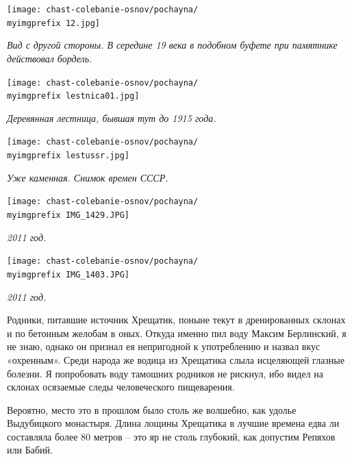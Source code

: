 \begin{center}
\texttt{[image: chast-colebanie-osnov/pochayna/\\myimgprefix 12.jpg]}

\textit{Вид с другой стороны. В середине 19 века в подобном буфете при памятнике действовал бордель.}
\end{center}

\newpage


\begin{center}
\texttt{[image: chast-colebanie-osnov/pochayna/\\myimgprefix lestnica01.jpg]}

\textit{Деревянная лестница, бывшая тут до 1915 года.}
\end{center}


\begin{center}
\texttt{[image: chast-colebanie-osnov/pochayna/\\myimgprefix lestussr.jpg]}

\textit{Уже каменная. Снимок времен СССР.}
\end{center}

\newpage

\begin{center}
\texttt{[image: chast-colebanie-osnov/pochayna/\\myimgprefix IMG\_1429.JPG]}

\textit{2011 год.}
\end{center}


\begin{center}
\texttt{[image: chast-colebanie-osnov/pochayna/\\myimgprefix IMG\_1403.JPG]}

\textit{2011 год.}
\end{center}

\newpage

Родники, питавшие источник Хрещатик, поныне текут в дренированных склонах и по бетонным желобам в оных. Откуда именно пил воду Максим Берлинский, я не знаю, однако он признал ея непригодной к употреблению и назвал вкус «охренным». Среди народа же водица из Хрещатика слыла исцеляющей глазные болезни. Я попробовать воду тамошних родников не рискнул, ибо видел на склонах осязаемые следы человеческого пищеварения.

Вероятно, место это в прошлом было столь же волшебно, как удолье Выдубицкого монастыря. Длина лощины Хрещатика в лучшие времена едва ли составляла более 80 метров – это яр не столь глубокий, как допустим Репяхов или Бабий. 


